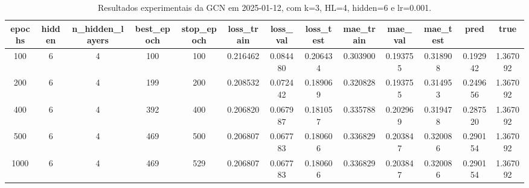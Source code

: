 \begin{table}[h]
\centering
\caption{Resultados experimentais da GCN em 2025-01-12, com k=3, HL=4, hidden=6 e lr=0.001.}
\label{tab:gcn_results_k3_hl4_h6_d20250112}
\begin{tabular}{ccccccccccccc}
\toprule
epochs & hidden & n\_hidden\_layers & best\_epoch & stop\_epoch & loss\_train & loss\_val & loss\_test & mae\_train & mae\_val & mae\_test & pred & true \\
\midrule
100 & 6 & 4 & 100 & 100 & 0.216462 & 0.084480 & 0.206434 & 0.303900 & 0.193755 & 0.318908 & 0.192942 & 1.367092 \\
200 & 6 & 4 & 199 & 200 & 0.208532 & 0.072442 & 0.189069 & 0.320828 & 0.193755 & 0.314953 & 0.249656 & 1.367092 \\
400 & 6 & 4 & 392 & 400 & 0.206820 & 0.067987 & 0.181057 & 0.335788 & 0.202969 & 0.319478 & 0.287520 & 1.367092 \\
500 & 6 & 4 & 469 & 500 & 0.206807 & 0.067783 & 0.180606 & 0.336829 & 0.203847 & 0.320086 & 0.290154 & 1.367092 \\
1000 & 6 & 4 & 469 & 529 & 0.206807 & 0.067783 & 0.180606 & 0.336829 & 0.203847 & 0.320086 & 0.290154 & 1.367092 \\
\bottomrule
\end{tabular}
\end{table}
